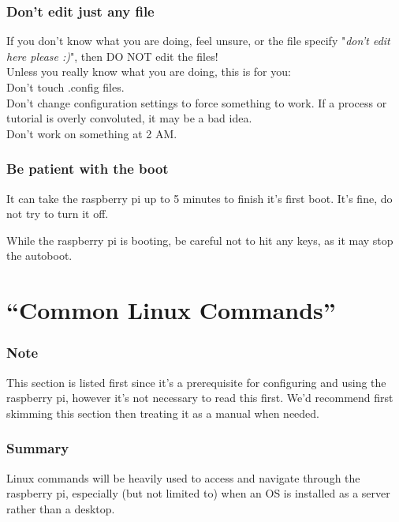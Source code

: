 \documentclass[a4paper, 10pt]{article}
\begin{document}
            \subsubsection{Don't edit just any file}
            If you don't know what you are doing, feel unsure, or the file specify "\textit{don't edit here please :)}", then DO NOT edit the files!\\

            Unless you really know what you are doing, this is for you:\\
            Don't touch .config files.\\
            Don't change configuration settings to force something to work. If a process or tutorial is overly convoluted, it may be a bad idea.\\
            Don't work on something at 2 AM.

            \subsubsection{Be patient with the boot}
            It can take the raspberry pi up to 5 minutes to finish it's first boot. It's fine, do not try to turn it off.

            While the raspberry pi is booting, be careful not to hit any keys, as it may stop the autoboot.

 

 \pagebreak


\section{``Common Linux Commands''}
		\subsubsection*{Note}
		This section is listed first since it's a prerequisite for           configuring and using the raspberry pi, however it's not             necessary to read this first.
            We'd recommend first skimming this section then treating it as a manual when needed.

            \subsubsection*{Summary}
            Linux commands will be heavily used to access and navigate through the raspberry pi, especially (but not limited to) when an OS is installed as a server rather than a desktop.
	
\end{document}
